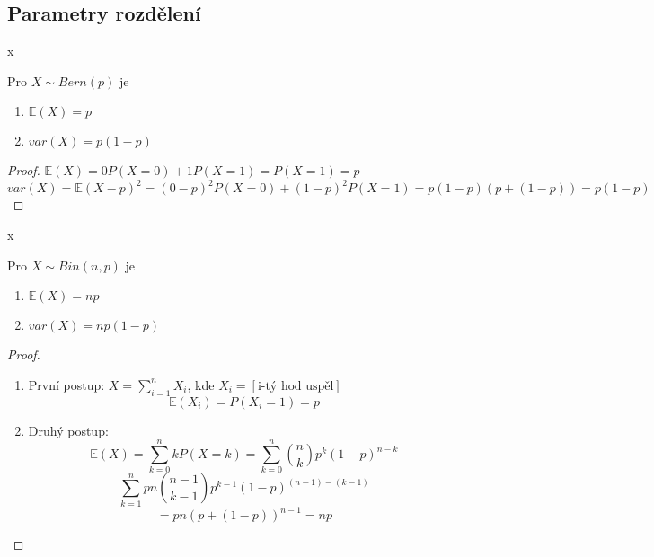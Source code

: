 \documentclass[../main.tex]{subfiles}
\begin{document}
\subsection{Parametry rozdělení}

\begin{theorem}
    {\color{white} x}

    Pro $X\sim Bern(p)$ je 
    \begin{enumerate}
        \item $\mathbb{E}(X) = p$
        \item $var(X) = p(1-p)$
    \end{enumerate}
\end{theorem}
\begin{proof}
    $\mathbb{E}(X) = 0P(X=0)+1P(X=1) = P(X=1) = p$\\
    $var(X) = \mathbb{E}(X-p)^2 = (0-p)^2P(X=0) + (1-p)^2P(X=1) = p(1-p)(p+(1-p)) = p(1-p)$
\end{proof}

\begin{theorem}
    {\color{white} x}

    Pro $X\sim Bin(n,p)$ je
    \begin{enumerate}
        \item $\mathbb{E}(X) = np$
        \item $var(X) = np(1-p)$
    \end{enumerate}
\end{theorem}
\begin{proof}
    \begin{enumerate}
        \item První postup: $X = \sum^n_{i=1}X_i$, kde $X_i = [\text{i-tý hod uspěl}]$
        \[\mathbb{E}(X_i) = P(X_i = 1) = p\]
        \item Druhý postup:
        \[\mathbb{E}(X) = \sum^n_{k=0} kP(X=k) = \sum^n_{k=0}\binom{n}{k}p^k(1-p)^{n-k}\]
        \[\sum_{k=1}^n pn \binom{n-1}{k-1}p^{k-1}(1-p)^{(n-1) - (k-1)}\]
        \[ = pn (p + (1-p))^{n-1} = np\]
    \end{enumerate}
\end{proof}
\end{document}
